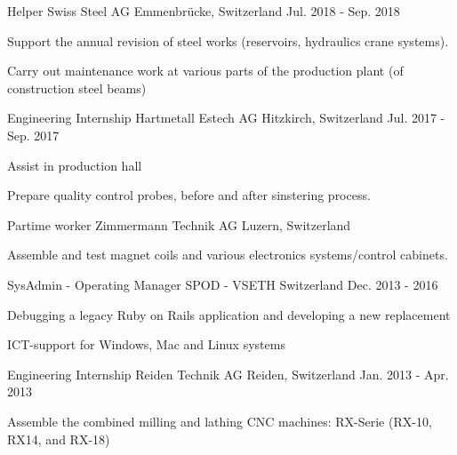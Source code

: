 \begin{cventries}
\cventry
  {Helper} %
  {Swiss Steel AG} %
  {Emmenbrücke, Switzerland} %
  {Jul. 2018 - Sep. 2018} %
  {
    \begin{cvitems} %
      \item {Support the annual revision of steel works (reservoirs, hydraulics crane systems).}
      \item {Carry out maintenance work at various parts of the production plant (of construction steel beams)}
    \end{cvitems}
} 

\cventry
{Engineering Internship} %
{Hartmetall Estech AG} %
{Hitzkirch, Switzerland} %
{Jul. 2017 - Sep. 2017} %
{
	\begin{cvitems} %
		\item {Assist in production hall}
    \item {Prepare quality control probes, before and after sinstering process.}
	\end{cvitems}
}

\cventry
  {Partime worker} %
  {Zimmermann Technik AG} %
  {Luzern, Switzerland} %
  {} %
  {
    \begin{cvitems} %
      \item {Assemble and test magnet coils and various electronics systems/control cabinets.}
    \end{cvitems}
  } 


  \cventry
    {SysAdmin - Operating Manager} %
    {SPOD - VSETH} %
    {Switzerland} %
    {Dec. 2013 - 2016} %
    {
      \begin{cvitems} %
        \item {Debugging a legacy Ruby on Rails application and developing a new replacement}
        \item {ICT-support for Windows, Mac and Linux systems}
      \end{cvitems}
    }

  \cventry
    {Engineering Internship} %
    {Reiden Technik AG} %
    {Reiden, Switzerland} %
    {Jan. 2013 - Apr. 2013} %
    {
      \begin{cvitems} %
        \item {Assemble the combined milling and lathing CNC machines: RX-Serie (RX-10, RX14, and RX-18)}
      \end{cvitems}
    }


\end{cventries}
